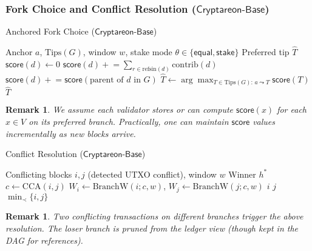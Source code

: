 \documentclass[11pt]{article}
\newtheorem{remark}[theorem]{Remark}
\newcommand{\ProjBase}{\ensuremath{\mathsf{Cryptareon\text{-}Base}}\xspace}
\newcommand{\shortrefs}{\ensuremath{\mathrm{refs}{\mathrm{in}}}\xspace}
\newcommand{\Tips}{\ensuremath{\mathrm{Tips}}\xspace}
\newcommand{\ForkChoiceUpdate}{\textsc{ForkChoiceUpdate}\xspace}
\newcommand{\BranchW}{\ensuremath{\mathrm{BranchW}}\xspace}
\newcommand{\CCA}{\ensuremath{\mathrm{CCA}}\xspace}
\newcommand{\contrib}{\ensuremath{\mathrm{contrib}}\xspace}
\begin{document}
\subsubsection{Fork Choice and Conflict Resolution (\ProjBase)}
\begin{algorithm}[H]
\caption{Anchored Fork Choice (\ProjBase)}
\label{alg:fork-choice}
\begin{algorithmic}[1]
\Require Anchor $a$, $\Tips(G)$, window $w$, stake mode $\theta\in\{\mathsf{equal},\mathsf{stake}\}$
\Ensure Preferred tip $\hat{T}$
  \State $\mathsf{score}(d) \gets 0$
\EndFor
{}
  \State $\mathsf{score}(d) \mathrel{+}= \sum_{r\in \shortrefs(d)} \contrib(d)$
  \State $\mathsf{score}(d) \mathrel{+}= \mathsf{score}(\text{parent of }d\text{ in }G)$ 
\EndFor
\State $\hat{T} \gets \arg\max_{T\in \Tips(G):\,a\leadsto T} \mathsf{score}(T)$
\State \Return $\hat{T}$
\end{algorithmic}
\end{algorithm}

\begin{remark}
We assume each validator stores or can compute $\mathsf{score}(x)$ for each $x\in V$ on its preferred branch. Practically, one can maintain $\mathsf{score}$ values incrementally as new blocks arrive.
\end{remark}

\begin{algorithm}[H]
\caption{Conflict Resolution (\ProjBase)}
\label{alg:cca-resolve}
\begin{algorithmic}[1]
\Require Conflicting blocks $i,j$ (detected UTXO conflict), window $w$
\Ensure Winner $h^*$
\State $c \gets \CCA(i,j)$
\State $W_i\gets\BranchW(i;c,w)$, \quad $W_j\gets\BranchW(j;c,w)$
 \Return $i$
 \Return $j$
\Else \Return $\min\nolimits_{\prec}\{i,j\}$ 
\EndIf
\end{algorithmic}
\end{algorithm}

\begin{remark}
Two conflicting transactions on different branches trigger the above resolution. The loser branch is pruned from the ledger view (though kept in the DAG for references).
\end{remark}

\end{document}
